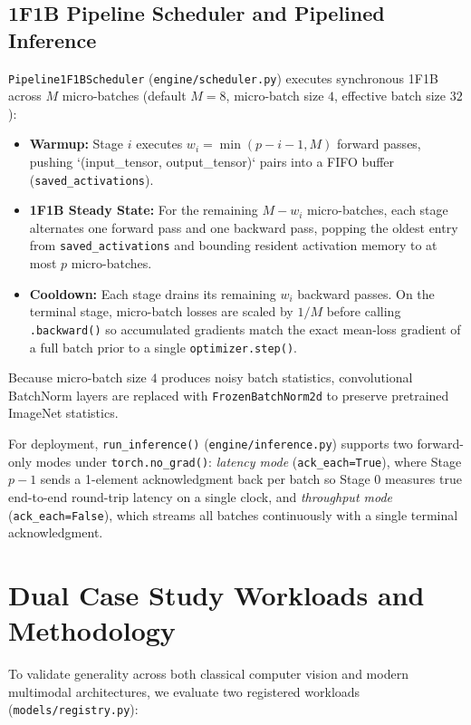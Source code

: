 \documentclass[conference]{IEEEtran}
\begin{document}
\subsection{1F1B Pipeline Scheduler and Pipelined Inference}
\texttt{Pipeline1F1BScheduler} (\texttt{engine/scheduler.py}) executes synchronous 1F1B across $M$ micro-batches (default $M = 8$, micro-batch size $4$, effective batch size $32$):
\begin{itemize}
    \item \textbf{Warmup:} Stage $i$ executes $w_i = \min(p - i - 1, M)$ forward passes, pushing `(input_tensor, output_tensor)` pairs into a FIFO buffer (\texttt{saved\_activations}).
    \item \textbf{1F1B Steady State:} For the remaining $M - w_i$ micro-batches, each stage alternates one forward pass and one backward pass, popping the oldest entry from \texttt{saved\_activations} and bounding resident activation memory to at most $p$ micro-batches.
    \item \textbf{Cooldown:} Each stage drains its remaining $w_i$ backward passes. On the terminal stage, micro-batch losses are scaled by $1/M$ before calling \texttt{.backward()} so accumulated gradients match the exact mean-loss gradient of a full batch prior to a single \texttt{optimizer.step()}.
\end{itemize}
Because micro-batch size $4$ produces noisy batch statistics, convolutional BatchNorm layers are replaced with \texttt{FrozenBatchNorm2d} to preserve pretrained ImageNet statistics.

For deployment, \texttt{run\_inference()} (\texttt{engine/inference.py}) supports two forward-only modes under \texttt{torch.no\_grad()}: \textit{latency mode} (\texttt{ack\_each=True}), where Stage $p-1$ sends a 1-element acknowledgment back per batch so Stage 0 measures true end-to-end round-trip latency on a single clock, and \textit{throughput mode} (\texttt{ack\_each=False}), which streams all batches continuously with a single terminal acknowledgment.

\section{Dual Case Study Workloads and Methodology}

To validate generality across both classical computer vision and modern multimodal architectures, we evaluate two registered workloads (\texttt{models/registry.py}):
\end{document}
